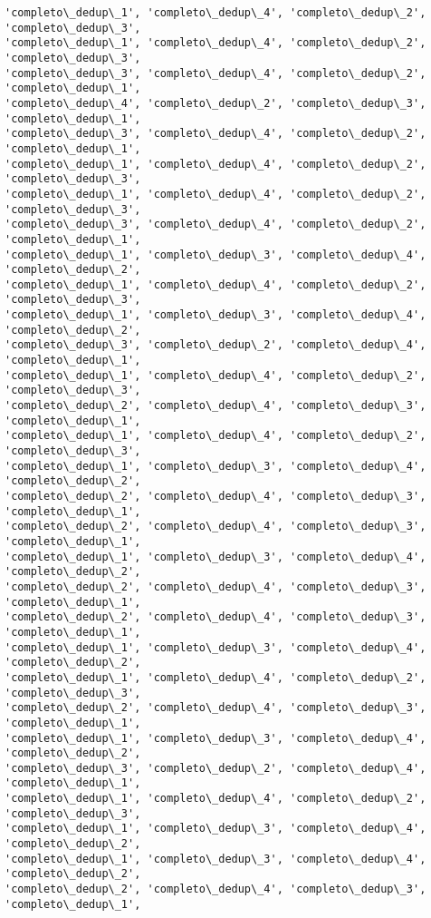 \documentclass[11pt]{article}
\begin{document}
\begin{Verbatim}[commandchars=\\\{\}]
'completo\_dedup\_1', 'completo\_dedup\_4', 'completo\_dedup\_2', 'completo\_dedup\_3',
'completo\_dedup\_1', 'completo\_dedup\_4', 'completo\_dedup\_2', 'completo\_dedup\_3',
'completo\_dedup\_3', 'completo\_dedup\_4', 'completo\_dedup\_2', 'completo\_dedup\_1',
'completo\_dedup\_4', 'completo\_dedup\_2', 'completo\_dedup\_3', 'completo\_dedup\_1',
'completo\_dedup\_3', 'completo\_dedup\_4', 'completo\_dedup\_2', 'completo\_dedup\_1',
'completo\_dedup\_1', 'completo\_dedup\_4', 'completo\_dedup\_2', 'completo\_dedup\_3',
'completo\_dedup\_1', 'completo\_dedup\_4', 'completo\_dedup\_2', 'completo\_dedup\_3',
'completo\_dedup\_3', 'completo\_dedup\_4', 'completo\_dedup\_2', 'completo\_dedup\_1',
'completo\_dedup\_1', 'completo\_dedup\_3', 'completo\_dedup\_4', 'completo\_dedup\_2',
'completo\_dedup\_1', 'completo\_dedup\_4', 'completo\_dedup\_2', 'completo\_dedup\_3',
'completo\_dedup\_1', 'completo\_dedup\_3', 'completo\_dedup\_4', 'completo\_dedup\_2',
'completo\_dedup\_3', 'completo\_dedup\_2', 'completo\_dedup\_4', 'completo\_dedup\_1',
'completo\_dedup\_1', 'completo\_dedup\_4', 'completo\_dedup\_2', 'completo\_dedup\_3',
'completo\_dedup\_2', 'completo\_dedup\_4', 'completo\_dedup\_3', 'completo\_dedup\_1',
'completo\_dedup\_1', 'completo\_dedup\_4', 'completo\_dedup\_2', 'completo\_dedup\_3',
'completo\_dedup\_1', 'completo\_dedup\_3', 'completo\_dedup\_4', 'completo\_dedup\_2',
'completo\_dedup\_2', 'completo\_dedup\_4', 'completo\_dedup\_3', 'completo\_dedup\_1',
'completo\_dedup\_2', 'completo\_dedup\_4', 'completo\_dedup\_3', 'completo\_dedup\_1',
'completo\_dedup\_1', 'completo\_dedup\_3', 'completo\_dedup\_4', 'completo\_dedup\_2',
'completo\_dedup\_2', 'completo\_dedup\_4', 'completo\_dedup\_3', 'completo\_dedup\_1',
'completo\_dedup\_2', 'completo\_dedup\_4', 'completo\_dedup\_3', 'completo\_dedup\_1',
'completo\_dedup\_1', 'completo\_dedup\_3', 'completo\_dedup\_4', 'completo\_dedup\_2',
'completo\_dedup\_1', 'completo\_dedup\_4', 'completo\_dedup\_2', 'completo\_dedup\_3',
'completo\_dedup\_2', 'completo\_dedup\_4', 'completo\_dedup\_3', 'completo\_dedup\_1',
'completo\_dedup\_1', 'completo\_dedup\_3', 'completo\_dedup\_4', 'completo\_dedup\_2',
'completo\_dedup\_3', 'completo\_dedup\_2', 'completo\_dedup\_4', 'completo\_dedup\_1',
'completo\_dedup\_1', 'completo\_dedup\_4', 'completo\_dedup\_2', 'completo\_dedup\_3',
'completo\_dedup\_1', 'completo\_dedup\_3', 'completo\_dedup\_4', 'completo\_dedup\_2',
'completo\_dedup\_1', 'completo\_dedup\_3', 'completo\_dedup\_4', 'completo\_dedup\_2',
'completo\_dedup\_2', 'completo\_dedup\_4', 'completo\_dedup\_3', 'completo\_dedup\_1',

\end{Verbatim}
\end{document}

